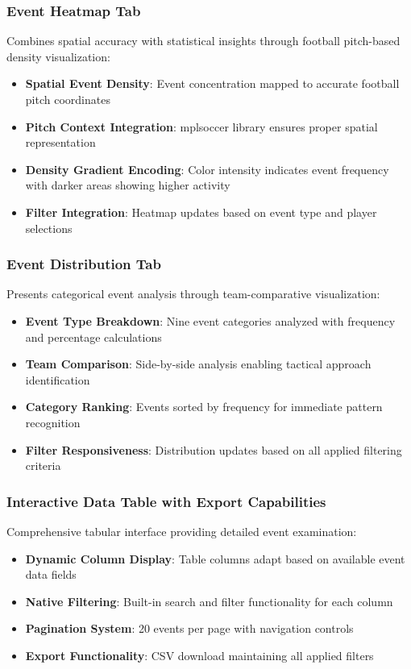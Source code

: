 \documentclass[12pt,a4paper]{article}
\begin{document}
\subsubsection{Event Heatmap Tab}
Combines spatial accuracy with statistical insights through football pitch-based density visualization:
\begin{itemize}
    \item \textbf{Spatial Event Density}: Event concentration mapped to accurate football pitch coordinates
    \item \textbf{Pitch Context Integration}: mplsoccer library ensures proper spatial representation
    \item \textbf{Density Gradient Encoding}: Color intensity indicates event frequency with darker areas showing higher activity
    \item \textbf{Filter Integration}: Heatmap updates based on event type and player selections
\end{itemize}



\subsubsection{Event Distribution Tab}
Presents categorical event analysis through team-comparative visualization:
\begin{itemize}
    \item \textbf{Event Type Breakdown}: Nine event categories analyzed with frequency and percentage calculations
    \item \textbf{Team Comparison}: Side-by-side analysis enabling tactical approach identification
    \item \textbf{Category Ranking}: Events sorted by frequency for immediate pattern recognition
    \item \textbf{Filter Responsiveness}: Distribution updates based on all applied filtering criteria
\end{itemize}


\subsubsection{Interactive Data Table with Export Capabilities}
Comprehensive tabular interface providing detailed event examination:
\begin{itemize}
    \item \textbf{Dynamic Column Display}: Table columns adapt based on available event data fields
    \item \textbf{Native Filtering}: Built-in search and filter functionality for each column
    \item \textbf{Pagination System}: 20 events per page with navigation controls
    \item \textbf{Export Functionality}: CSV download maintaining all applied filters
\end{itemize}
\end{document}

